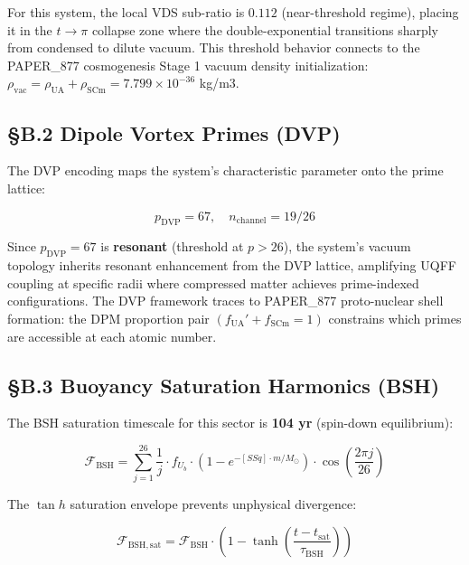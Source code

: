 \documentclass[12pt,a4paper]{article}
\begin{document}
For this system, the local VDS sub-ratio is $0.112$ (near-threshold regime), placing it in the $t \to \pi$ collapse zone where the double-exponential transitions sharply from condensed to dilute vacuum. This threshold behavior connects to the PAPER\_877 cosmogenesis Stage 1 vacuum density initialization: $\rho_{\mathrm{vac}} = \rho_{\mathrm{UA}} + \rho_{\mathrm{SCm}} = 7.799 \times 10^{-36}$ kg/m3.

\subsection{\S{}B.2 Dipole Vortex Primes (DVP)}

The DVP encoding maps the system's characteristic parameter onto the prime lattice:

\begin{equation}
p_{\mathrm{DVP}} = 67, \quad n_{\mathrm{channel}} = 19/26
\end{equation}

Since $p_{\mathrm{DVP}} = 67$ is \textbf{resonant} (threshold at $p > 26$), the system's vacuum topology inherits resonant enhancement from the DVP lattice, amplifying UQFF coupling at specific radii where compressed matter achieves prime-indexed configurations. The DVP framework traces to PAPER\_877 proto-nuclear shell formation: the DPM proportion pair $(f_{\mathrm{UA}}' + f_{\mathrm{SCm}} = 1)$ constrains which primes are accessible at each atomic number.

\subsection{\S{}B.3 Buoyancy Saturation Harmonics (BSH)}

The BSH saturation timescale for this sector is \textbf{104 yr} (spin-down equilibrium):

\begin{equation}
\mathcal{F}_{\mathrm{BSH}} = \sum_{j=1}^{26} \frac{1}{j} \cdot f_U_b \cdot \left(1 - e^{-[SSq] \cdot m/M_\odot}\right) \cdot \cos\!\left(\frac{2\pi j}{26}\right)
\end{equation}

The $\tan h$ saturation envelope prevents unphysical divergence:

\begin{equation}
\mathcal{F}_{\mathrm{BSH,sat}} = \mathcal{F}_{\mathrm{BSH}} \cdot \left(1 - \tanh\!\left(\frac{t - t_{\mathrm{sat}}}{\tau_{\mathrm{BSH}}}\right)\right)
\end{equation}
\end{document}
